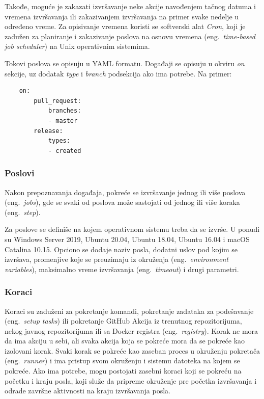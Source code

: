 \documentclass[12pt]{report}
\begin{document}
Takođe, moguće je zakazati izvršavanje neke akcije navođenjem tačnog datuma i vremena izvršavanja ili zakazivanjem izvršavanja na primer svake nedelje u određeno vreme. Za opisivanje vremena koristi se softverski alat \textit{Cron}, koji je zadužen za planiranje i zakazivanje poslova na osnovu vremena (eng.\ \textit{time-based job scheduler}) na Unix operativnim sistemima.

Tokovi poslova se opisuju u YAML formatu. Događaji se opisuju u okviru \textit{on} sekcije, uz dodatak \textit{type} i \textit{branch} podsekcija ako ima potrebe. Na primer:

\begin{samepage}
    \begin{verbatim}
    on:
        pull_request:
            branches:
            - master
        release:
            types:
            - created
    \end{verbatim}
\end{samepage}

\subsubsection{Poslovi}

Nakon prepoznavanja događaja, pokreće se izvršavanje jednog ili više poslova (eng.\ \textit{jobs}), gde se svaki od poslova može sastojati od jednog ili više koraka (eng.\ \textit{step}).

Za poslove se definiše na kojem operativnom sistemu treba da se izvrše. U ponudi su Windows Server 2019, Ubuntu 20.04, Ubuntu 18.04, Ubuntu 16.04 i macOS Catalina 10.15. Opciono se dodaje naziv posla, dodatni uslov pod kojim se izvršava, promenjive koje se preuzimaju iz okruženja (eng.\ \textit{environment variables}), maksimalno vreme izvršavanja (eng.\ \textit{timeout}) i drugi parametri.

\subsubsection{Koraci}

Koraci su zaduženi za pokretanje komandi, pokretanje zadataka za podešavanje (eng.\ \textit{setup tasks}) ili pokretanje GitHub Akcija iz trenutnog repozitorijuma, nekog javnog repozitorijuma ili sa Docker registra (eng.\ \textit{registry}). Korak ne mora da ima akciju u sebi, ali svaka akcija koja se pokreće mora da se pokreće kao izolovani korak. Svaki korak se pokreće kao zaseban proces u okruženju pokretača (eng.\ \textit{runner}) i ima pristup svom okruženju i sistemu datoteka na kojem se pokreće. Ako ima potrebe, mogu postojati zasebni koraci koji se pokreću na početku i kraju posla, koji služe da pripreme okruženje pre početka izvršavanja i odrade završne aktivnosti na kraju izvršavanja posla.
\end{document}
